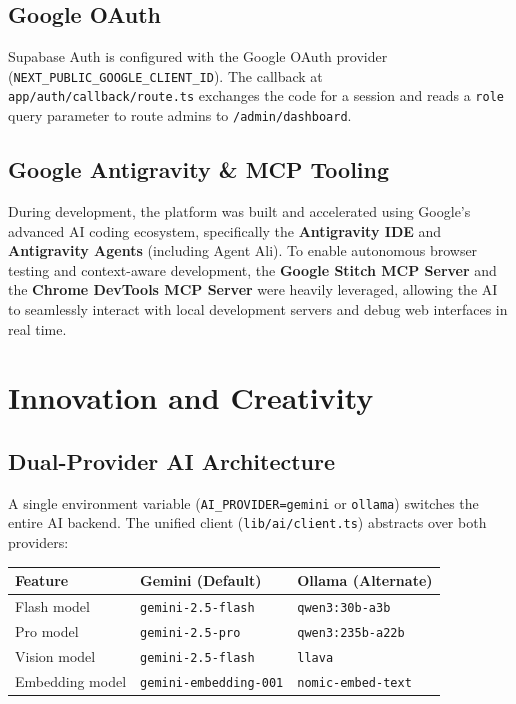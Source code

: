 \documentclass[11pt,a4paper]{article}
\newcommand{\thead}[1]{{\color{white}\bfseries\sffamily #1}}
\newcommand{\tech}[1]{\texttt{\color{cpteal}#1}}
\newcommand{\file}[1]{\texttt{\footnotesize\color{cpgray}#1}}
\begin{document}
\subsection{Google OAuth}
Supabase Auth is configured with the Google OAuth provider (\tech{NEXT\_PUBLIC\_GOOGLE\_CLIENT\_ID}). The callback at \file{app/auth/callback/route.ts} exchanges the code for a session and reads a \tech{role} query parameter to route admins to \file{/admin/dashboard}.

\subsection{Google Antigravity \& MCP Tooling}
During development, the platform was built and accelerated using Google's advanced AI coding ecosystem, specifically the \textbf{Antigravity IDE} and \textbf{Antigravity Agents} (including Agent Ali). To enable autonomous browser testing and context-aware development, the \textbf{Google Stitch MCP Server} and the \textbf{Chrome DevTools MCP Server} were heavily leveraged, allowing the AI to seamlessly interact with local development servers and debug web interfaces in real time.

\clearpage

\section{Innovation and Creativity}
\label{sec:innovation}

\subsection{Dual-Provider AI Architecture}
A single environment variable (\tech{AI\_PROVIDER=gemini} or \tech{ollama}) switches the entire AI backend. The unified client (\file{lib/ai/client.ts}) abstracts over both providers:

\begin{tabular}{@{} L{3.5cm} L{4.5cm} L{4.5cm} @{}}
\toprule
{}
\thead{Feature} & \thead{Gemini (Default)} & \thead{Ollama (Alternate)} \\
\midrule
Flash model     & \tech{gemini-2.5-flash}   & \tech{qwen3:30b-a3b} \\
Pro model       & \tech{gemini-2.5-pro}     & \tech{qwen3:235b-a22b} \\
Vision model    & \tech{gemini-2.5-flash}   & \tech{llava} \\
Embedding model & \tech{gemini-embedding-001} & \tech{nomic-embed-text} \\
\bottomrule
\end{tabular}
\end{document}
